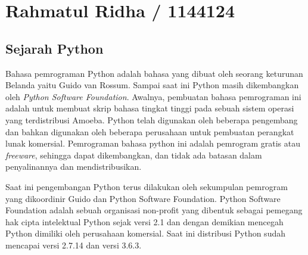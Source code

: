 
\section{Rahmatul Ridha / 1144124}
\subsection{Sejarah Python}
Bahasa pemrograman Python adalah bahasa yang dibuat oleh seorang keturunan Belanda yaitu Guido van Rossum. Sampai saat ini Python masih dikembangkan oleh \textit{Python Software Foundation}. Awalnya, pembuatan bahasa pemrograman ini adalah untuk membuat skrip bahasa tingkat tinggi pada sebuah sistem operasi yang terdistribusi Amoeba. Python telah digunakan oleh beberapa pengembang dan bahkan digunakan oleh beberapa perusahaan untuk pembuatan perangkat lunak komersial. Pemrograman bahasa python ini adalah pemrogram gratis atau \textit{freeware}, sehingga dapat dikembangkan, dan tidak ada batasan dalam penyalinannya dan mendistribusikan.

Saat ini pengembangan Python terus dilakukan oleh sekumpulan pemrogram yang dikoordinir Guido dan Python Software Foundation. Python Software Foundation adalah sebuah organisasi non-profit yang dibentuk sebagai pemegang hak cipta intelektual Python sejak versi 2.1 dan dengan demikian mencegah Python dimiliki oleh perusahaan komersial. Saat ini distribusi Python sudah mencapai versi 2.7.14 dan versi 3.6.3.

